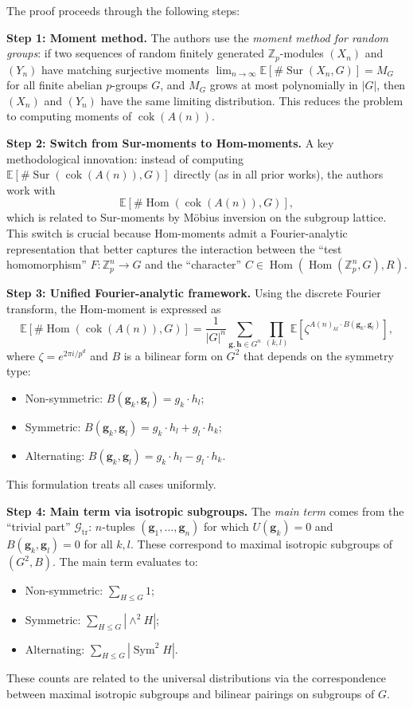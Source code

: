 \documentclass[11pt,a4paper]{article}
\begin{document}
The proof proceeds through the following steps:

\medskip
\noindent\textbf{Step 1: Moment method.}
The authors use the \emph{moment method for random groups}: if two sequences of random finitely generated $\mathbb{Z}_p$-modules $(X_n)$ and $(Y_n)$ have matching surjective moments
$\lim_{n\to\infty} \mathbb{E}[\#\operatorname{Sur}(X_n, G)] = M_G$
for all finite abelian $p$-groups $G$, and $M_G$ grows at most polynomially in $|G|$, then $(X_n)$ and $(Y_n)$ have the same limiting distribution. This reduces the problem to computing moments of $\operatorname{cok}(A(n))$.

\medskip
\noindent\textbf{Step 2: Switch from Sur-moments to Hom-moments.}
A key methodological innovation: instead of computing $\mathbb{E}[\#\operatorname{Sur}(\operatorname{cok}(A(n)), G)]$ directly (as in all prior works), the authors work with
\[
\mathbb{E}[\#\operatorname{Hom}(\operatorname{cok}(A(n)), G)],
\]
which is related to Sur-moments by M\"obius inversion on the subgroup lattice. This switch is crucial because Hom-moments admit a Fourier-analytic representation that better captures the interaction between the ``test homomorphism'' $F\colon \mathbb{Z}_p^n \to G$ and the ``character'' $C \in \operatorname{Hom}(\operatorname{Hom}(\mathbb{Z}_p^n, G), R)$.

\medskip
\noindent\textbf{Step 3: Unified Fourier-analytic framework.}
Using the discrete Fourier transform, the Hom-moment is expressed as
\[
\mathbb{E}[\#\operatorname{Hom}(\operatorname{cok}(A(n)), G)] = \frac{1}{|G|^n} \sum_{\mathbf{g},\mathbf{h} \in G^n} \prod_{(k,l)} \mathbb{E}[\zeta^{A(n)_{kl} \cdot B(\mathbf{g}_k, \mathbf{g}_l)}],
\]
where $\zeta = e^{2\pi i / p^d}$ and $B$ is a bilinear form on $G^2$ that depends on the symmetry type:
\begin{itemize}
    \item Non-symmetric: $B(\mathbf{g}_k, \mathbf{g}_l) = g_k \cdot h_l$;
    \item Symmetric: $B(\mathbf{g}_k, \mathbf{g}_l) = g_k \cdot h_l + g_l \cdot h_k$;
    \item Alternating: $B(\mathbf{g}_k, \mathbf{g}_l) = g_k \cdot h_l - g_l \cdot h_k$.
\end{itemize}
This formulation treats all cases uniformly.

\medskip
\noindent\textbf{Step 4: Main term via isotropic subgroups.}
The \emph{main term} comes from the ``trivial part'' $\mathcal{G}_{\mathrm{tr}}$: $n$-tuples $(\mathbf{g}_1,\ldots,\mathbf{g}_n)$ for which $U(\mathbf{g}_k) = 0$ and $B(\mathbf{g}_k,\mathbf{g}_l)=0$ for all $k,l$. These correspond to maximal isotropic subgroups of $(G^2, B)$. The main term evaluates to:
\begin{itemize}
    \item Non-symmetric: $\sum_{H\le G} 1$;
    \item Symmetric: $\sum_{H\le G} |\wedge^2 H|$;
    \item Alternating: $\sum_{H\le G} |\operatorname{Sym}^2 H|$.
\end{itemize}
These counts are related to the universal distributions via the correspondence between maximal isotropic subgroups and bilinear pairings on subgroups of $G$.
\end{document}
